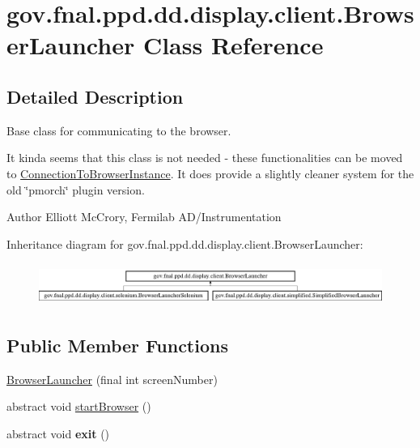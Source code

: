 \hypertarget{classgov_1_1fnal_1_1ppd_1_1dd_1_1display_1_1client_1_1BrowserLauncher}{\section{gov.\-fnal.\-ppd.\-dd.\-display.\-client.\-Browser\-Launcher Class Reference}
\label{classgov_1_1fnal_1_1ppd_1_1dd_1_1display_1_1client_1_1BrowserLauncher}
}


\subsection{Detailed Description}
Base class for communicating to the browser.

It kinda seems that this class is not needed -\/ these functionalities can be moved to \hyperlink{classgov_1_1fnal_1_1ppd_1_1dd_1_1display_1_1client_1_1ConnectionToBrowserInstance}{Connection\-To\-Browser\-Instance}. It does provide a slightly cleaner system for the old \char`\"{}pmorch\char`\"{} plugin version.

\begin{DoxyAuthor}{Author}
Elliott Mc\-Crory, Fermilab A\-D/\-Instrumentation 
\end{DoxyAuthor}
Inheritance diagram for gov.\-fnal.\-ppd.\-dd.\-display.\-client.\-Browser\-Launcher\-:\begin{figure}[H]
\begin{center}
\leavevmode
\includegraphics[height=1.393035cm]{classgov_1_1fnal_1_1ppd_1_1dd_1_1display_1_1client_1_1BrowserLauncher}
\end{center}
\end{figure}
\subsection*{Public Member Functions}
\begin{DoxyCompactItemize}
\item 
\hyperlink{classgov_1_1fnal_1_1ppd_1_1dd_1_1display_1_1client_1_1BrowserLauncher_aca76d8caee5d9de33b80e3397292ca25}{Browser\-Launcher} (final int screen\-Number)
\item 
abstract void \hyperlink{classgov_1_1fnal_1_1ppd_1_1dd_1_1display_1_1client_1_1BrowserLauncher_a09da69929d79dc20075d5be2572f361c}{start\-Browser} ()
\item 
\hypertarget{classgov_1_1fnal_1_1ppd_1_1dd_1_1display_1_1client_1_1BrowserLauncher_adce8df8835d3d00a6cbad7f7c8189820}{abstract void {\bfseries exit} ()}\label{classgov_1_1fnal_1_1ppd_1_1dd_1_1display_1_1client_1_1BrowserLauncher_adce8df8835d3d00a6cbad7f7c8189820}

\end{DoxyCompactItemize}
